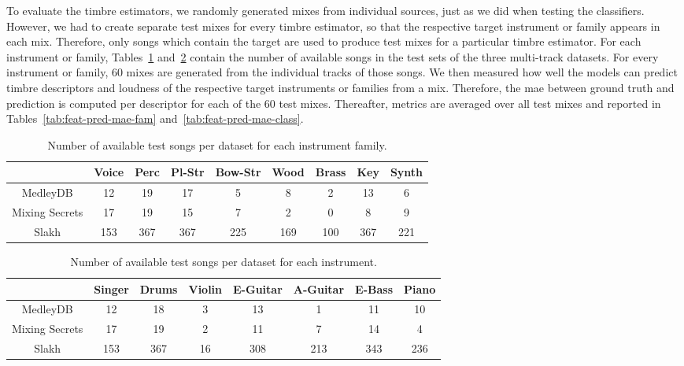 To evaluate the timbre estimators, we randomly generated mixes from individual sources, just as we did when testing the classifiers. However, we had to create separate test mixes for every timbre estimator, so that the respective target instrument or family appears in each mix. Therefore, only songs which contain the target are used to produce test mixes for a particular timbre estimator. For each instrument or family, Tables~\ref{tab:numb-songs-per-fam} and~\ref{tab:numb-songs-per-class} contain the number of available songs in the test sets of the three multi-track datasets. For every instrument or family, 60 mixes are generated from the individual tracks of those songs. We then measured how well the models can predict timbre descriptors and loudness of the respective target instruments or families from a mix. Therefore, the \gls{mae} between ground truth and prediction is computed per descriptor for each of the 60 test mixes. Thereafter, metrics are averaged over all test mixes and reported in Tables~\ref{tab:feat-pred-mae-fam} and~\ref{tab:feat-pred-mae-class}.\\
\begin{table}[]
	\centering
	\begin{tabular}{c|c|c|c|c|c|c|c|c}
		                & Voice & Perc & Pl-Str & Bow-Str & Wood & Brass & Key & Synth \\ \hline
		MedleyDB	    & 12    & 19   & 17     & 5       & 8    & 2     & 13  & 6 \\ \hline
		Mixing Secrets	& 17    & 19   & 15     & 7       & 2    & 0     & 8   & 9 \\ \hline
		Slakh	        & 153   & 367  & 367    & 225     & 169  & 100   & 367 & 221 \\
	\end{tabular}
	\caption{Number of available test songs per dataset for each instrument family.}
	\label{tab:numb-songs-per-fam}
\end{table}
\begin{table}[]
	\centering
	\begin{tabular}{c|c|c|c|c|c|c|c}
		               & Singer & Drums & Violin & E-Guitar & A-Guitar & E-Bass & Piano \\ \hline
		MedleyDB	   & 12     & 18    & 3      & 13       & 1        & 11     & 10 \\ \hline
		Mixing Secrets & 17     & 19    & 2      & 11       & 7        & 14     & 4 \\ \hline
		Slakh	       & 153    & 367   & 16     & 308      & 213      & 343    & 236 \\
	\end{tabular}
	\caption{Number of available test songs per dataset for each instrument.}
	\label{tab:numb-songs-per-class}
\end{table}
